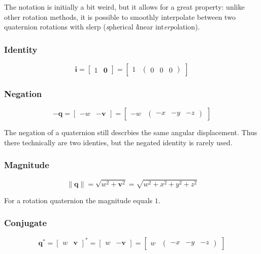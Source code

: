 \documentclass[a4paper,11pt]{article}
\begin{document}
The notation is initially a bit weird, but it allows for a great property: unlike other rotation methods, it is possible to smoothly interpolate between two quaternion rotations with slerp (\textit{s}pherical \textit{l}inear int\textit{erp}olation). 

\subsubsection{Identity}

$$
\textbf{i}=\begin{bmatrix}
	1 & \textbf{0}
\end{bmatrix}=\begin{bmatrix}
	1 & \begin{pmatrix}
		0 & 0 & 0
	\end{pmatrix}
\end{bmatrix}
$$

\subsubsection{Negation}

$$-\textbf{q}=\begin{bmatrix}
	-w & -\textbf{v}
\end{bmatrix}=\begin{bmatrix}
	-w & \begin{pmatrix}
		-x & -y & -z
	\end{pmatrix}
\end{bmatrix}$$

The negation of a quaternion still descrbies the same angular displacement. Thus there technically are two identies, but the negated identity is rarely used.

\subsubsection{Magnitude}

$$\|\textbf{q}\|=\sqrt{w^2+\textbf{v}^2}=\sqrt{w^2+x^2+y^2+z^2}$$

For a rotation quaternion the magnitude equals $1$.

\subsubsection{Conjugate}

$$\textbf{q}^*=\begin{bmatrix}
	w & \textbf{v}
\end{bmatrix}^*=\begin{bmatrix}
	w & -\textbf{v}
\end{bmatrix}=\begin{bmatrix}
	w & \begin{pmatrix}
		-x & -y & -z
	\end{pmatrix}
\end{bmatrix}$$
\end{document}
